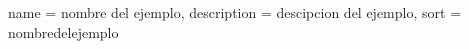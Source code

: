 \newpage
 {
  name = {nombre del ejemplo},
  description = {descipcion del ejemplo},
  sort = {nombredelejemplo}
}


